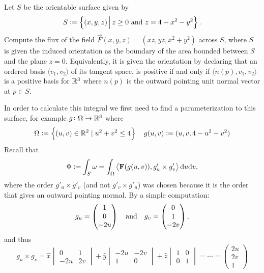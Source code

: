 \documentclass[11pt,a4paper]{article}
\begin{document}
\begin{exercise}
  Let $S$ be the orientable surface given by
  \[
    S := \left\{(x,y,z) \,\middle\vert\, z \geq 0 \text{ and } z = 4 - x^2 - y^2\right\}.
  \]
  Compute the flux of the field $\vec F(x,y,z) = (xz, yz, x^2 + y^2)$
  across $S$,
  where $S$ is given the induced orientation as the boundary of
  the area bounded between $S$ and the plane $z = 0$.
  Equivalently, it is given the orientation by declaring that
  an ordered basis $\langle v_1,v_2\rangle$ of its tangent space,
  is positive if and only if $\langle n(p),v_1,v_2\rangle$ is a positive
  basis for $\mathbb{R}^3$ where $n(p)$ is the outward pointing unit normal vector
  at $p \in S$.
\end{exercise}
\begin{solution}
  In order to calculate this integral we first need to find a
  parameterization to this surface,
  for example $g \colon \Omega \to \mathbb{R}^3$ where
  \[
    \Omega := \left\{(u,v) \in \mathbb{R}^2 \mid u^2 + v^2 \le 4\right\} \quad
    g(u,v) := (u,v,4-u^2-v^2)
  \]
  Recall that
  \[
    \Phi := \int_{S} \omega =
    \int_{\Omega} \left\langle 
    \boldsymbol{\mathbf{F}}(g(u,v)), g'_u \times g'_v \right\rangle \mathrm{d} u \mathrm{d} v,
  \]
  where the order $g'_u \times g'_v$ (and not $g'_v \times g'_u$)
  was chosen because it is the order that gives an outward pointing normal.
  By a simple computation:
  \[
    g_u =
    \begin{pmatrix}
      1 \\ 0 \\ -2u
    \end{pmatrix} \quad \text{and} \quad
    g_v =
    \begin{pmatrix}
      0 \\ 1 \\ -2v
    \end{pmatrix},
  \]
  and thus
  \[
    g_u \times g_v =
    \hat x
    \begin{vmatrix}
      0 & 1 \\
      -2u & 2v
    \end{vmatrix} +
    \hat y
    \begin{vmatrix}
      -2u & -2v \\
      1 & 0
    \end{vmatrix} +
    \hat z
    \begin{vmatrix}
      1 & 0 \\
      0 & 1
    \end{vmatrix} = \cdots =
    \begin{pmatrix}
      2u \\ 2v \\ 1

\end{pmatrix}\]
\end{solution}
\end{document}
